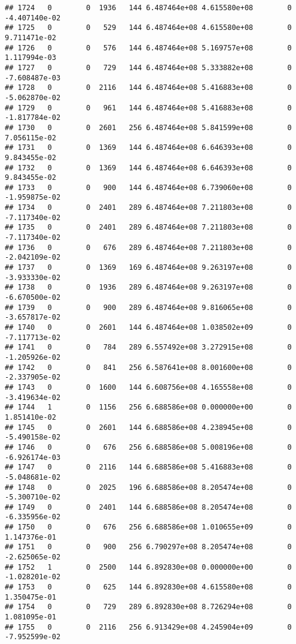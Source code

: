 \documentclass[
]{article}
\begin{document}
\begin{enumerate}
\begin{verbatim}
## 1724   0        0  1936   144 6.487464e+08 4.615580e+08        0 -4.407140e-02
## 1725   0        0   529   144 6.487464e+08 4.615580e+08        0  9.711471e-02
## 1726   0        0   576   144 6.487464e+08 5.169757e+08        0  1.117994e-03
## 1727   0        0   729   144 6.487464e+08 5.333882e+08        0 -7.608487e-03
## 1728   0        0  2116   144 6.487464e+08 5.416883e+08        0 -5.062870e-02
## 1729   0        0   961   144 6.487464e+08 5.416883e+08        0 -1.817784e-02
## 1730   0        0  2601   256 6.487464e+08 5.841599e+08        0  7.056115e-02
## 1731   0        0  1369   144 6.487464e+08 6.646393e+08        0  9.843455e-02
## 1732   0        0  1369   144 6.487464e+08 6.646393e+08        0  9.843455e-02
## 1733   0        0   900   144 6.487464e+08 6.739060e+08        0 -1.959875e-02
## 1734   0        0  2401   289 6.487464e+08 7.211803e+08        0 -7.117340e-02
## 1735   0        0  2401   289 6.487464e+08 7.211803e+08        0 -7.117340e-02
## 1736   0        0   676   289 6.487464e+08 7.211803e+08        0 -2.042109e-02
## 1737   0        0  1369   169 6.487464e+08 9.263197e+08        0 -3.933330e-02
## 1738   0        0  1936   289 6.487464e+08 9.263197e+08        0 -6.670500e-02
## 1739   0        0   900   289 6.487464e+08 9.816065e+08        0 -3.657817e-02
## 1740   0        0  2601   144 6.487464e+08 1.038502e+09        0 -7.117713e-02
## 1741   0        0   784   289 6.557492e+08 3.272915e+08        0 -1.205926e-02
## 1742   0        0   841   256 6.587641e+08 8.001600e+08        0 -2.337905e-02
## 1743   0        0  1600   144 6.608756e+08 4.165558e+08        0 -3.419634e-02
## 1744   1        0  1156   256 6.688586e+08 0.000000e+00        0  1.851410e-02
## 1745   0        0  2601   144 6.688586e+08 4.238945e+08        0 -5.490158e-02
## 1746   0        0   676   256 6.688586e+08 5.008196e+08        0 -6.926174e-03
## 1747   0        0  2116   144 6.688586e+08 5.416883e+08        0 -5.048681e-02
## 1748   0        0  2025   196 6.688586e+08 8.205474e+08        0 -5.300710e-02
## 1749   0        0  2401   144 6.688586e+08 8.205474e+08        0 -6.335956e-02
## 1750   0        0   676   256 6.688586e+08 1.010655e+09        0  1.147376e-01
## 1751   0        0   900   256 6.790297e+08 8.205474e+08        0 -2.625065e-02
## 1752   1        0  2500   144 6.892830e+08 0.000000e+00        0 -1.028201e-02
## 1753   0        0   625   144 6.892830e+08 4.615580e+08        0  1.350475e-01
## 1754   0        0   729   289 6.892830e+08 8.726294e+08        0  1.081095e-01
## 1755   0        0  2116   256 6.913429e+08 4.245904e+09        0 -7.952599e-02

\end{verbatim}
\end{enumerate}
\end{document}
